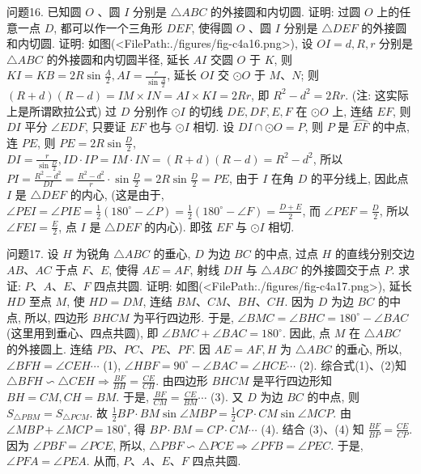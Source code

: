 问题16. 已知圆 $O$ 、圆 $I$ 分别是 $\triangle A B C$ 的外接圆和内切圆.
证明: 过圆 $O$ 上的任意一点 $D$, 都可以作一个三角形 $D E F$, 使得圆 $O$ 、圆 $I$ 分别是 $\triangle D E F$ 的外接圆和内切圆.
证明: 如图(<FilePath:./figures/fig-c4a16.png>), 设 $O I=d, R, r$ 分别是 $\triangle A B C$ 的外接圆和内切圆半径, 延长 $A I$ 交圆 $O$ 于 $K$, 则 $K I=K B=2 R \sin \frac{A}{2}, A I=\frac{r}{\sin \frac{A}{2}}$, 延长 $O I$ 交 $\odot O$ 于 $M 、 N$; 则 $(R+d)(R-d)=I M \times I N= A I \times K I=2 R r$, 即 $R^2-d^2=2 R r$. (注: 这实际上是所谓欧拉公式) 过 $D$ 分别作 $\odot I$ 的切线 $D E, D F, E, F$ 在 $\odot O$ 上, 连结 $E F$, 则 $D I$ 平分 $\angle E D F$, 只要证 $E F$ 也与 $\odot I$ 相切.
设 $D I \cap \odot O=P$, 则 $P$ 是 $\overparen{E F}$ 的中点, 连 $P E$, 则 $P E=2 R \sin \frac{D}{2}$, $D I=\frac{r}{\sin \frac{D}{2}}, I D \cdot I P=I M \cdot I N=(R+d)(R-d)=R^2-d^2$, 所以 $P I= \frac{R^2-d^2}{D I}=\frac{R^2-d^2}{r} \cdot \sin \frac{D}{2}=2 R \sin \frac{D}{2}=P E$, 由于 $I$ 在角 $D$ 的平分线上, 因此点 $I$ 是 $\triangle D E F$ 的内心, (这是由于, $\angle P E I=\angle P I E=\frac{1}{2}\left(180^{\circ}-\angle P\right)= \frac{1}{2}\left(180^{\circ}-\angle F\right)=\frac{D+E}{2}$, 而 $\angle P E F=\frac{D}{2}$, 所以 $\angle F E I=\frac{E}{2}$, 点 $I$ 是 $\triangle D E F$ 的内心). 即弦 $E F$ 与 $\odot I$ 相切.



问题17. 设 $H$ 为锐角 $\triangle A B C$ 的垂心, $D$ 为边 $B C$ 的中点, 过点 $H$ 的直线分别交边 $A B 、 A C$ 于点 $F 、 E$, 使得 $A E=A F$, 射线 $D H$ 与 $\triangle A B C$ 的外接圆交于点 $P$. 求证: $P 、 A 、 E 、 F$ 四点共圆.
证明: 如图(<FilePath:./figures/fig-c4a17.png>), 延长 $H D$ 至点 $M$, 使 $H D=D M$, 连结 $B M 、 C M 、 B H 、 C H$. 因为 $D$ 为边 $B C$ 的中点, 所以, 四边形 $B H C M$ 为平行四边形.
于是, $\angle B M C= \angle B H C=180^{\circ}-\angle B A C$ (这里用到垂心、四点共圆), 即 $\angle B M C+\angle B A C=180^{\circ}$. 因此, 点 $M$ 在 $\triangle A B C$ 的外接圆上.
连结 $P B 、 P C 、 P E 、 P F$. 因 $A E=A F, H$ 为 $\triangle A B C$ 的垂心, 所以, $\angle B F H=\angle C E H \cdots$ (1), $\angle H B F= 90^{\circ}-\angle B A C=\angle H C E \cdots$ (2).
综合式(1)、(2)知 $\triangle B F H \backsim \triangle C E H \Rightarrow \frac{B F}{B H}=\frac{C E}{C H}$. 由四边形 $B H C M$ 是平行四边形知 $B H=C M, C H=B M$. 于是, $\frac{B F}{C M}=\frac{C E}{B M} \cdots$ (3). 又 $D$ 为边 $B C$ 的中点, 则 $S_{\triangle P B M}=S_{\triangle P C M}$. 故 $\frac{1}{2} B P \cdot B M \sin \angle M B P=\frac{1}{2} C P \cdot C M \sin \angle M C P$. 由 $\angle M B P+\angle M C P=180^{\circ}$, 得 $B P \cdot B M=C P \cdot C M \cdots$ (4). 结合 (3)、(4) 知 $\frac{B F}{B P}=\frac{C E}{C P}$. 因为 $\angle P B F=\angle P C E$, 所以, $\triangle P B F \backsim \triangle P C E \Rightarrow \angle P F B= \angle P E C$. 于是, $\angle P F A=\angle P E A$. 从而, $P 、 A 、 E 、 F$ 四点共圆.



